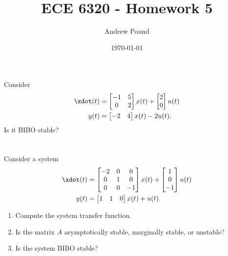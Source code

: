 \documentclass[10pt]{article}
\title{ECE 6320 - Homework 5
}
\author{Andrew Pound}
\date{\today}
\begin{document}
\maketitle




\section{}
Consider
\begin{equation*}
  \begin{split}
    \xdot(t) &=
    \begin{bmatrix}
      -1 & 5 \\ 0 & 2
    \end{bmatrix}x(t) +
    \begin{bmatrix}
      2 \\ 0
    \end{bmatrix}u(t)\\
    y(t) &= 
    \begin{bmatrix}
      -2 & 4
    \end{bmatrix}x(t) - 2u(t).
  \end{split}
\end{equation*}
Is it BIBO stable?

\section{}
Consider a system 
\begin{equation*}
  \begin{split}
    \xdot(t) &=
    \begin{bmatrix}
      -2 & 0 & 0 \\ 0 & 1 & 0 \\ 0 & 0 & -1
    \end{bmatrix}x(t) +
    \begin{bmatrix}
      1 \\ 0 \\ -1
    \end{bmatrix}u(t)\\
    y(t) &= 
    \begin{bmatrix}
      1 & 1 & 0
    \end{bmatrix}x(t) + u(t).
  \end{split}
\end{equation*}
\begin{enumerate}[label=(\alph*)]
\item Compute the system transfer function.
\item Is the matrix $A$ asymptotically stable, marginally stable, or unstable?
\item Is the system BIBO stable?
\end{enumerate}
\end{document}
